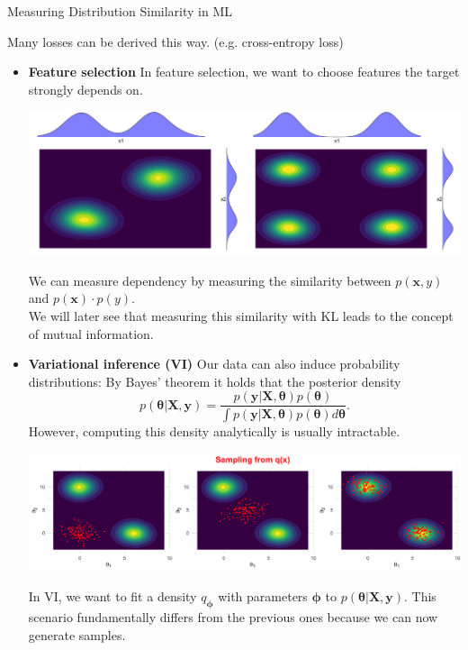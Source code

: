 \documentclass[11pt,compress,t,notes=noshow, xcolor=table]{beamer}
\begin{document}
\begin{vbframe} {Measuring Distribution Similarity in ML}
\begin{itemize}
\lz

Many losses can be derived this way. (e.g. cross-entropy loss)

\end{itemize}

\framebreak

\begin{itemize}
    \item \textbf{Feature selection}
In feature selection, we want to choose features the target strongly depends on. 

\begin{center}
\includegraphics[width=0.9\linewidth]{figure/gaussian_mixture_with_marginals.png}
\end{center}

We can measure dependency by measuring the similarity between $p(\mathbf{x}, y)$ and $p(\mathbf{x})\cdot p(y).$ \\
We will later see that measuring this similarity with KL  leads to the concept of mutual information.

\end{itemize}

\framebreak

\begin{itemize}
    \item \textbf{Variational inference (VI)}
Our data can also induce probability distributions: By Bayes' theorem it holds that the posterior density $$p(\bm{\theta}\vert \mathbf{X}, \mathbf{y}) = \frac{p(\mathbf{y}|\mathbf{X}, \bm{\theta})p(\bm{\theta})}{\int p(\mathbf{y}|\mathbf{X}, \bm{\theta})p(\bm{\theta})d\bm{\theta}}.$$ However, computing this density analytically is usually intractable.

\begin{center}
\includegraphics[width=0.99\linewidth]{figure/gaussian_mixture_scatter.png}
\end{center}

In VI, we want to fit a density $q_{\bm{\phi}}$ with parameters $\bm{\phi}$ to 
    $p(\bm{\theta}\vert \mathbf{X}, \mathbf{y}).$
This scenario fundamentally differs from the previous ones because we can now generate samples.

\end{itemize}

\end{vbframe}
\end{document}
